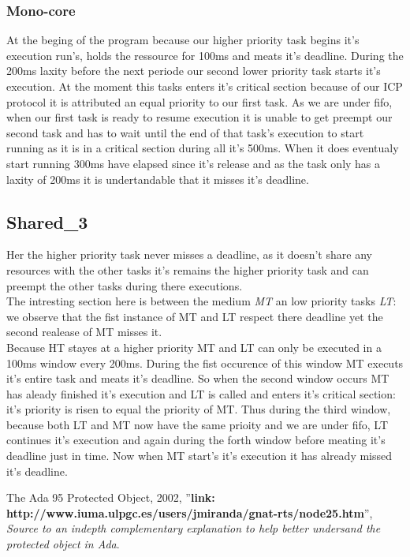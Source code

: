 \documentclass[10pt,a4paper]{article}
\begin{document}
\subsubsection{Mono-core}
At the beging of the program because our higher priority task begins it's execution run's, holds the ressource for 100ms and meats it's deadline. During the 200ms laxity before the next periode our second lower priority task starts it's execution. At the moment this tasks enters it's critical section because of our ICP protocol it is attributed an equal priority to our first task. As we are under fifo, when our first task is ready to resume execution it is unable to get preempt our second task and has to wait until the end of that task's execution to start running as it is in a critical section during all it's 500ms. When it does eventualy start running 300ms have elapsed since it's release and as the task only has a laxity of 200ms it is undertandable that it misses it's deadline.
\subsection{Shared\_3}
Her the higher priority task never misses a deadline, as it doesn't share any resources with the other tasks it's remains the higher priority task and can preempt the other tasks during there executions.\\
The intresting section here is between the medium \textit{MT} an low priority tasks \textit{LT}: we observe that the fist instance of MT and LT respect there deadline yet the second realease of MT misses it.\\
Because HT stayes at a higher priority MT and LT can only be executed in a 100ms window every 200ms. During the fist occurence of this window MT executs it's entire task and meats it's deadline. So when the second window occurs MT has aleady finished it's execution and LT is called and enters it's critical section: it's priority is risen to equal the priority of MT. Thus during the third window, because both LT and MT now have the same prioity and we are under fifo, LT continues it's execution and again during the forth window before meating it's deadline just in time. Now when MT start's it's execution it has already missed it's deadline.

\begin{thebibliography}{80}

The Ada 95 Protected Object, 2002,
''\textbf{link: http://www.iuma.ulpgc.es/users/jmiranda/gnat-rts/node25.htm}'',
\textit{Source to an indepth complementary explanation to help better undersand the protected object in Ada}.

\end{thebibliography}
\end{document}
